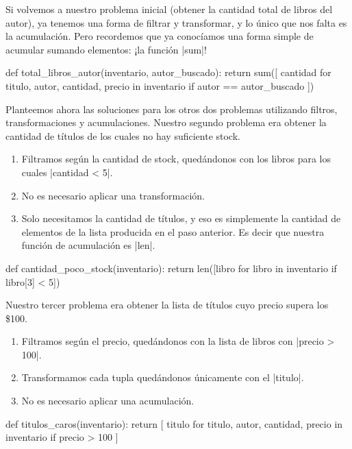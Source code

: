 \begin{subappendices}
Si volvemos a nuestro problema inicial (obtener la cantidad total de libros del
autor), ya tenemos una forma de filtrar y transformar, y lo único que nos falta
es la acumulación. Pero recordemos que ya conocíamos una forma simple de
acumular sumando elementos: ¡la función |sum|!

\begin{codigo-python-sn}
def total_libros_autor(inventario, autor_buscado):
    return sum([
        cantidad
        for titulo, autor, cantidad, precio in inventario
        if autor == autor_buscado
    ])
\end{codigo-python-sn}

Planteemos ahora las soluciones para los otros dos problemas utilizando
filtros, transformaciones y acumulaciones. Nuestro segundo problema era obtener
la cantidad de títulos de los cuales no hay suficiente stock.

\begin{enumerate}
    \item Filtramos según la cantidad de stock, quedándonos con los libros
        para los cuales |cantidad < 5|.
    \item No es necesario aplicar una transformación.
    \item Solo necesitamos la cantidad de títulos, y eso es simplemente la
        cantidad de elementos de la lista producida en el paso anterior. Es
        decir que nuestra función de acumulación es |len|.
\end{enumerate}

\begin{codigo-python-sn}
def cantidad_poco_stock(inventario):
    return len([libro for libro in inventario if libro[3] < 5])
\end{codigo-python-sn}

Nuestro tercer problema era obtener la lista de títulos cuyo precio supera los
\$100.

\begin{enumerate}
    \item Filtramos según el precio, quedándonos con la lista de libros con
        |precio > 100|.
    \item Transformamos cada tupla quedándonos únicamente con el |titulo|.
    \item No es necesario aplicar una acumulación.
\end{enumerate}

\begin{codigo-python-sn}
def titulos_caros(inventario):
    return [
        titulo
        for titulo, autor, cantidad, precio in inventario
        if precio > 100
    ]
\end{codigo-python-sn}


\end{subappendices}

